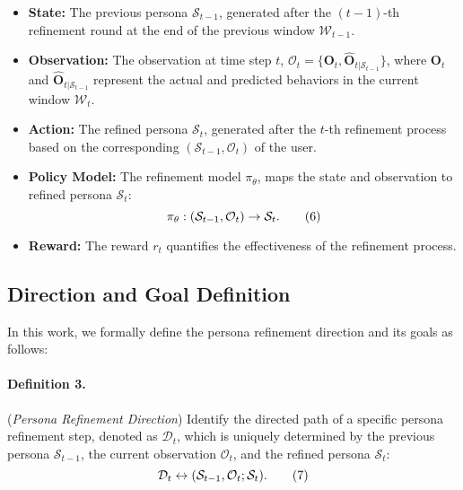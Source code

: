 \begin{itemize}[noitemsep,left=0pt]
\item \textbf{State:} The previous persona $\mathcal{S}_{t-1}$, generated after the $(t-1)$-th refinement round at the end of the previous window $\mathcal{W}_{t-1}$.

\item \textbf{Observation:} The observation at time step $t$, $\mathcal{O}_t = \{\mathbf{O}_t, \hat{\mathbf{O}}_{t|\mathcal{S}_{t-1}}\}$, where $\mathbf{O}_t$ and $\hat{\mathbf{O}}_{t|\mathcal{S}_{t-1}}$ represent the actual and predicted behaviors in the current window $\mathcal{W}_t$.

\item \textbf{Action:} The refined persona $\mathcal{S}_t$, generated after the $t$-th refinement process based on the corresponding $(\mathcal{S}_{t-1}, \mathcal{O}_t)$ of the user. 

\item \textbf{Policy Model:} The refinement model $\pi_\theta$, maps the state and observation to refined persona $\mathcal{S}_t$:
\vspace{-2mm}
\[
\pi_\theta : (\mathcal{S}_{t-1}, \mathcal{O}_t) \to \mathcal{S}_t. \tag{6}
\vspace{-2mm}
\]
\item \textbf{Reward:} The reward $r_t$ quantifies the effectiveness of the refinement process.
\end{itemize}

\subsection{Direction and Goal Definition}
In this work, we formally define the persona refinement direction and its goals as follows:

\noindent
\paragraph{Definition 3.} (\textit{Persona Refinement Direction}) Identify the directed path of a specific persona refinement step, denoted as $\mathcal{D}_t$, which is uniquely determined by the previous persona $\mathcal{S}_{t-1}$, the current observation $\mathcal{O}_t$, and the refined persona $\mathcal{S}_t$:
\vspace{-2mm}
\[
\mathcal{D}_t \leftrightarrow (\mathcal{S}_{t-1}, \mathcal{O}_t; \mathcal{S}_t). \tag{7}
\vspace{-2mm}
\]


